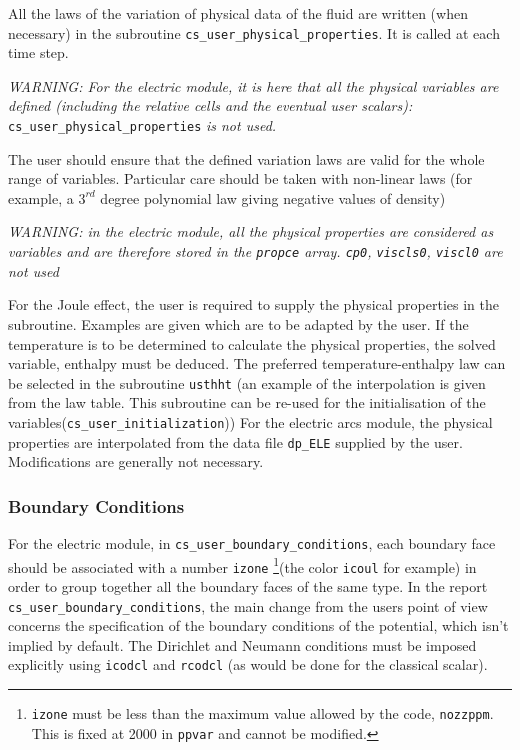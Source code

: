 {{All the laws of the variation of physical data of the fluid are written (when necessary)
in the subroutine \texttt{cs\_user\_physical\_properties}. It is called at each time step.

{\em WARNING: For the electric module, it is here that all the physical variables are defined
 (including the relative cells and the eventual user scalars):} \texttt{cs\_user\_physical\_properties} {\em {is not used.}}

The user should ensure that the defined variation laws are valid for the whole range of
variables. Particular care should be taken with non-linear laws (for example, a
 $3^{rd}$ degree polynomial law giving negative values of density)

{\em WARNING: in the electric module, all the physical properties are considered as variables
 and are therefore stored in the \texttt{propce} array. \texttt{cp0}, \texttt{viscls0}, \texttt{viscl0}
 are not used}

For the Joule effect, the user is required to supply the physical properties in the
subroutine. Examples are given which are to be adapted by the user. If the temperature is
to be determined to calculate the physical properties, the solved variable, enthalpy must
 be deduced. The preferred temperature-enthalpy law can be selected in the subroutine
 \texttt{usthht} (an example of the interpolation is given from the law table. This
subroutine can be re-used for the initialisation of the variables(\texttt{cs\_user\_initialization}))
 For the electric arcs module, the physical properties are interpolated from the data file
 \texttt{dp\_ELE} supplied by the user. Modifications are generally not necessary.

\subsubsection{Boundary Conditions}

For the electric module, in \texttt{cs\_user\_boundary\_conditions}, each
boundary face should be associated with a number
 \texttt{izone} \footnote{\texttt{izone} must be less than the maximum
 value allowed by the code, \texttt{nozzppm}. This is fixed at 2000 in \texttt
{ppvar} and cannot be modified.}(the color \texttt{icoul} for example) in
 order to group together all the boundary faces of the same type. In the report
 \texttt{cs\_user\_boundary\_conditions}, the main change from the users point of view concerns the
 specification of the boundary conditions of the potential, which isn't
 implied by default. The Dirichlet and Neumann conditions must be imposed
 explicitly using \texttt{icodcl} and \texttt{rcodcl} (as would be done for
 the classical scalar).

}}
